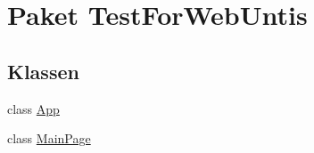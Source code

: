 \hypertarget{namespace_test_for_web_untis}{\section{Paket Test\-For\-Web\-Untis}
\label{namespace_test_for_web_untis}
}
\subsection*{Klassen}
\begin{DoxyCompactItemize}
\item 
class \hyperlink{class_test_for_web_untis_1_1_app}{App}
\item 
class \hyperlink{class_test_for_web_untis_1_1_main_page}{Main\-Page}
\end{DoxyCompactItemize}
